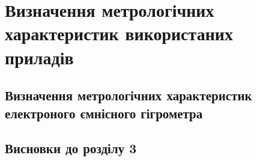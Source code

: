 \chapter{Визначення метрологічних характеристик використаних приладів}
\section{Визначення метрологічних характеристик електроного ємнісного гігрометра}

\section*{Висновки до розділу 3}
